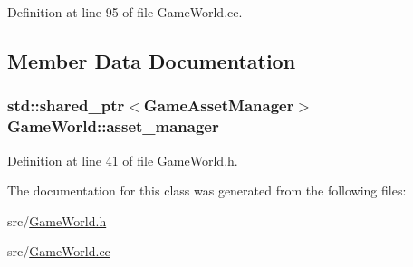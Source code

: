 Definition at line 95 of file Game\+World.\+cc.



\subsection{Member Data Documentation}
\hypertarget{class_game_world_aec5c0bca4fb5a41e4aac2dce2871266d}{}
\subsubsection[{asset\+\_\+manager}]{\setlength{\rightskip}{0pt plus 5cm}std\+::shared\+\_\+ptr$<${\bf Game\+Asset\+Manager}$>$ Game\+World\+::asset\+\_\+manager\hspace{0.3cm}{\ttfamily [private]}}\label{class_game_world_aec5c0bca4fb5a41e4aac2dce2871266d}


Definition at line 41 of file Game\+World.\+h.



The documentation for this class was generated from the following files\+:\begin{DoxyCompactItemize}
\item 
src/\hyperlink{_game_world_8h}{Game\+World.\+h}\item 
src/\hyperlink{_game_world_8cc}{Game\+World.\+cc}\end{DoxyCompactItemize}
